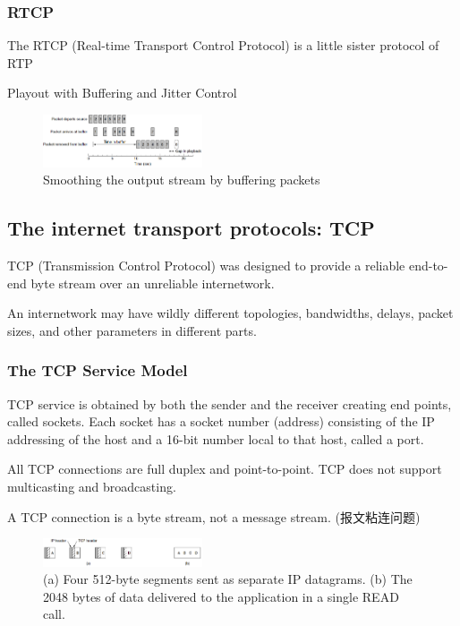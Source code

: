 \subsubsection{RTCP}
The RTCP (Real-time Transport Control Protocol) is a little sister protocol of RTP

Playout with Buffering and Jitter Control
\begin{figure}[!htb]
    \centering
    \includegraphics[width=0.42\textwidth]{pic/CN6/Smoothing the output stream by buffering packets}
    \caption{Smoothing the output stream by buffering packets}
\end{figure}

\subsection{The internet transport protocols: TCP}
TCP (Transmission Control Protocol) was designed to provide a reliable end-to-end byte stream over an unreliable internetwork. 

An internetwork may have wildly different topologies, bandwidths, delays, packet sizes, and other parameters in different parts.

\subsubsection{The TCP Service Model}
TCP service is obtained by both the sender and the receiver creating end points, called sockets. Each socket has a socket number (address) consisting of the IP addressing of the host and a 16-bit number local to that host, called a port.

All TCP connections are full duplex and point-to-point. TCP does not support multicasting and broadcasting. 

A TCP connection is a byte stream, not a message stream. (报文粘连问题)
\begin{figure}[!htb]
    \centering
    \includegraphics[width=0.42\textwidth]{pic/CN6/TCP connection is a byte stream}
    \caption{ (a) Four 512-byte segments sent as separate IP datagrams. (b) The 2048 bytes of data delivered to the application in a single READ call.}
\end{figure}

